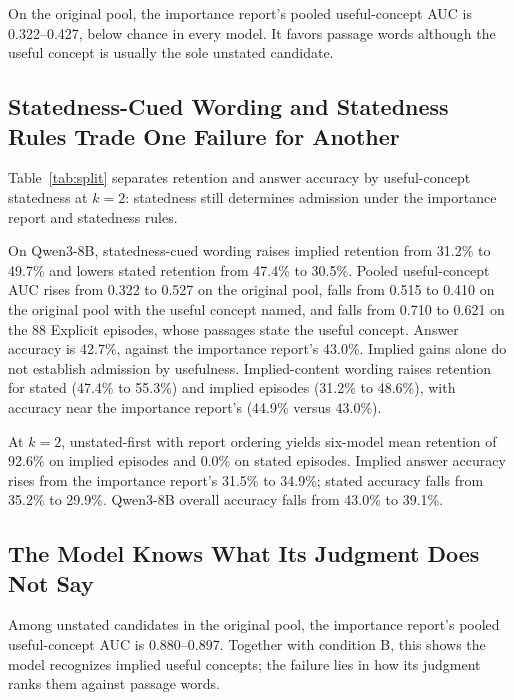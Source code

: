On the original pool, the importance report's pooled useful-concept AUC is 0.322--0.427, below chance in every model. It favors passage words although the useful concept is usually the sole unstated candidate.

\subsection{Statedness-Cued Wording and Statedness Rules Trade One Failure for Another}\label{sec:tradeoff}

Table~\ref{tab:split} separates retention and answer accuracy by useful-concept statedness at $k=2$: statedness still determines admission under the importance report and statedness rules.


On Qwen3-8B, statedness-cued wording raises implied retention from 31.2\% to 49.7\% and lowers stated retention from 47.4\% to 30.5\%. Pooled useful-concept AUC rises from 0.322 to 0.527 on the original pool, falls from 0.515 to 0.410 on the original pool with the useful concept named, and falls from 0.710 to 0.621 on the 88 Explicit episodes, whose passages state the useful concept. Answer accuracy is 42.7\%, against the importance report's 43.0\%. Implied gains alone do not establish admission by usefulness. Implied-content wording raises retention for stated (47.4\% to 55.3\%) and implied episodes (31.2\% to 48.6\%), with accuracy near the importance report's (44.9\% versus 43.0\%).

At $k=2$, unstated-first with report ordering yields six-model mean retention of 92.6\% on implied episodes and 0.0\% on stated episodes. Implied answer accuracy rises from the importance report's 31.5\% to 34.9\%; stated accuracy falls from 35.2\% to 29.9\%. Qwen3-8B overall accuracy falls from 43.0\% to 39.1\%.

\subsection{The Model Knows What Its Judgment Does Not Say}\label{sec:knowledge}

Among unstated candidates in the original pool, the importance report's pooled useful-concept AUC is 0.880--0.897. Together with condition B, this shows the model recognizes implied useful concepts; the failure lies in how its judgment ranks them against passage words.

